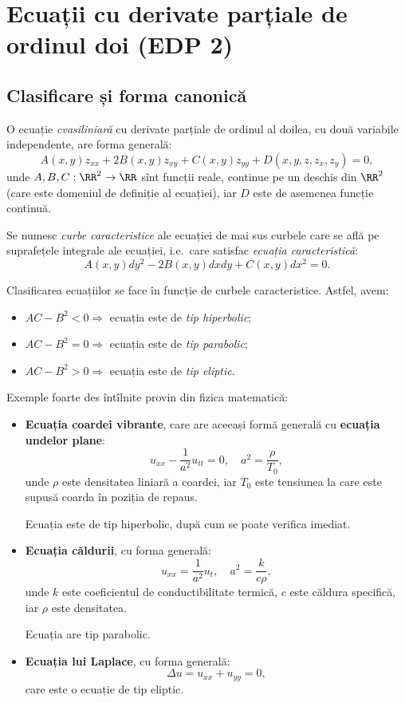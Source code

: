 \chapter{Ecuații cu derivate parțiale de ordinul doi (EDP 2)}

\section{Clasificare și forma canonică}
O ecuație \emph{cvasiliniară} cu derivate parțiale de ordinul al doilea,
cu două variabile independente, are forma generală:
\[
  A(x, y) z_{xx} + 2B(x, y) z_{xy} + C(x, y) z_{yy} + D(x, y, z, z_x, z_y) = 0,
\]
unde $ A, B, C : \RR^2 \to \RR$ sînt funcții reale, continue pe un deschis
din $ \RR^2 $ (care este domeniul de definiție al ecuației), iar $ D $ este
de asemenea funcție continuă.
\begin{definition}\label{def:curbe-car}
  Se numesc \emph{curbe caracteristice} ale ecuației de mai sus curbele care se
  află pe suprafețele integrale ale ecuației, i.e.\ care satisfac
  \emph{ecuația caracteristică}:
  \[
    A(x, y) dy^2 - 2B(x, y) dxdy + C(x, y) dx^2 = 0.
  \]
\end{definition}

Clasificarea ecuațiilor se face în funcție de curbele caracteristice.
Astfel, avem:
\begin{itemize}
\item $ AC - B^2 < 0 \Rightarrow $ ecuația este de \emph{tip hiperbolic};
\item $ AC - B^2 = 0 \Rightarrow $ ecuația este de \emph{tip parabolic};
\item $ AC - B^2 > 0 \Rightarrow $ ecuația este de \emph{tip eliptic}.
\end{itemize}

Exemple foarte des întîlnite provin din fizica matematică:
\begin{itemize}
\item \textbf{Ecuația coardei vibrante}, care are aceeași formă generală
  cu \textbf{ecuația undelor plane}:  
  \[
    u_{xx} - \dfrac{1}{a^2} u_{tt} = 0, \quad a^2 = \dfrac{\rho}{T_0},
  \]
  unde $ \rho $ este densitatea liniară a coardei, iar $ T_0 $ este tensiunea
  la care este supusă coarda în poziția de repaus.

  Ecuația este de tip hiperbolic, după cum se poate verifica imediat.
\item \textbf{Ecuația căldurii}, cu forma generală: 
  \[
    u_{xx} = \dfrac{1}{a^2} u_t, \quad a^2 = \dfrac{k}{c \rho},
  \]
  unde $ k $ este coeficientul de conductibilitate termică, $ c $ este
  căldura specifică, iar $ \rho $ este densitatea.

  Ecuația are tip parabolic.
\item \textbf{Ecuația lui Laplace}, cu forma generală: 
  \[
    \Delta u = u_{xx} + u_{yy} = 0,
  \]
  care este o ecuație de tip eliptic.
\end{itemize}

